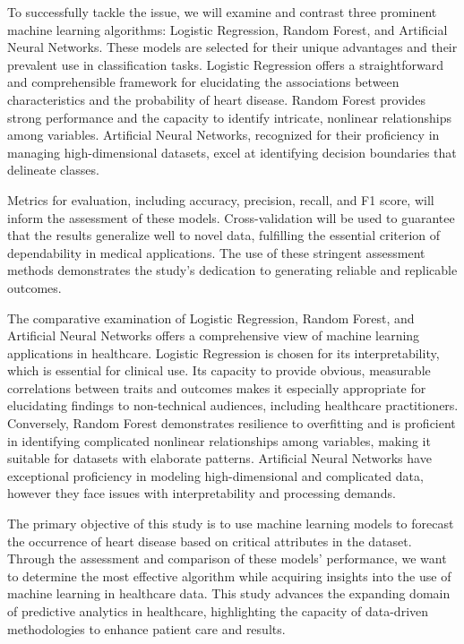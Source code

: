 To successfully tackle the issue, we will examine and contrast three prominent machine learning algorithms: Logistic Regression, Random Forest, and Artificial Neural Networks. These models are selected for their unique advantages and their prevalent use in classification tasks. Logistic Regression offers a straightforward and comprehensible framework for elucidating the associations between characteristics and the probability of heart disease. Random Forest provides strong performance and the capacity to identify intricate, nonlinear relationships among variables. Artificial Neural Networks, recognized for their proficiency in managing high-dimensional datasets, excel at identifying decision boundaries that delineate classes.

Metrics for evaluation, including accuracy, precision, recall, and F1 score, will inform the assessment of these models. Cross-validation will be used to guarantee that the results generalize well to novel data, fulfilling the essential criterion of dependability in medical applications. The use of these stringent assessment methods demonstrates the study's dedication to generating reliable and replicable outcomes.

The comparative examination of Logistic Regression, Random Forest, and Artificial Neural Networks offers a comprehensive view of machine learning applications in healthcare. Logistic Regression is chosen for its interpretability, which is essential for clinical use. Its capacity to provide obvious, measurable correlations between traits and outcomes makes it especially appropriate for elucidating findings to non-technical audiences, including healthcare practitioners. Conversely, Random Forest demonstrates resilience to overfitting and is proficient in identifying complicated nonlinear relationships among variables, making it suitable for datasets with elaborate patterns. Artificial Neural Networks have exceptional proficiency in modeling high-dimensional and complicated data, however they face issues with interpretability and processing demands.

The primary objective of this study is to use machine learning models to forecast the occurrence of heart disease based on critical attributes in the dataset. Through the assessment and comparison of these models' performance, we want to determine the most effective algorithm while acquiring insights into the use of machine learning in healthcare data. This study advances the expanding domain of predictive analytics in healthcare, highlighting the capacity of data-driven methodologies to enhance patient care and results.


